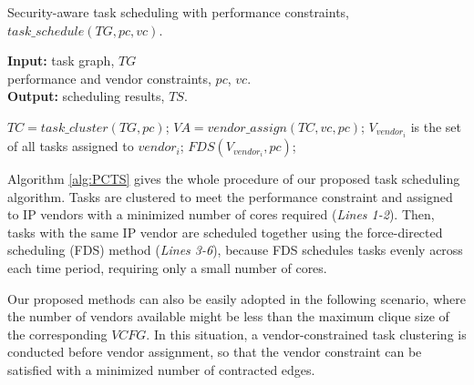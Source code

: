 \documentclass[10pt,journal, compsoc]{IEEEtran}
\begin{document}
\begin{algorithm}[!h]
\caption{Security-aware task scheduling with performance constraints, $task\_schedule(TG, pc, vc)$.}
\label{alg:PCTS}
{\textbf{Input:}} task graph, $TG$\\
\hspace*{2.4em} performance and vendor constraints, $pc$, $vc$.\\
{\textbf{Output:}} scheduling results, $TS$.
\begin{algorithmic}[1]
\STATE $TC=task\_cluster(TG,pc)$;
\STATE $VA=vendor\_assign(TC, vc, pc)$;
    \STATE $V_{vendor_i}$ is the set of all tasks assigned to $vendor_i$;
    \STATE $FDS(V_{vendor_i}, pc)$;%
\ENDFOR
\end{algorithmic}
\end{algorithm}



Algorithm \ref{alg:PCTS} gives the whole procedure of our proposed task scheduling algorithm. Tasks are clustered to meet the performance constraint and assigned to IP vendors with a minimized number of cores required (\textit{Lines 1-2}). Then, tasks with the same IP vendor are scheduled together using the force-directed scheduling (FDS) method \cite{article:PP} (\textit{Lines 3-6}), because FDS schedules tasks evenly across each time period, requiring only a small number of cores. %

Our proposed methods can also be easily adopted in the following scenario, where the number of vendors available might be less than the maximum clique size of the corresponding $VCFG$. In this situation, a vendor-constrained task clustering \cite{article:NW} is conducted before vendor assignment, so that the vendor constraint can be satisfied with a minimized number of contracted edges.%
\end{document}
